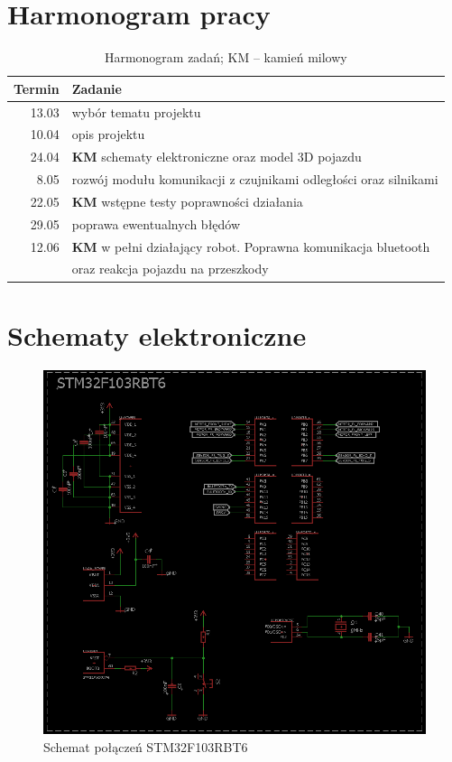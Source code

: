\documentclass[10pt, a4paper]{report}
\begin{document}
\section{Harmonogram pracy}
\begin{table}[!h]
	\centering
	\begin{tabular}{|r|l|} \hline
		\textbf{Termin} & \textbf{Zadanie} \\ \hline \hline
		13.03 & wybór tematu projektu \\ \hline
		10.04 & opis projektu \\ \hline
		24.04 & \textbf{KM} schematy elektroniczne oraz model 3D pojazdu \\ \hline
		8.05 & rozwój modułu komunikacji z czujnikami odległości oraz silnikami \\ \hline
		22.05 & \textbf{KM} wstępne testy poprawności działania \\ \hline
		29.05 & poprawa ewentualnych błędów \\ \hline
		12.06 & \textbf{KM} w pełni działający robot. Poprawna komunikacja bluetooth \\
		& oraz reakcja pojazdu na przeszkody \\ \hline
	\end{tabular}
	\caption{Harmonogram zadań; KM -- kamień milowy}
\end{table}

\newpage
	\section{Schematy elektroniczne}
	\begin{figure}[!h]
		\centering
		\includegraphics[scale=0.5, width=\textwidth ,height=\textheight ,keepaspectratio]{STM32.png}
		\caption{Schemat połączeń STM32F103RBT6}
	\end{figure}
\end{document}
